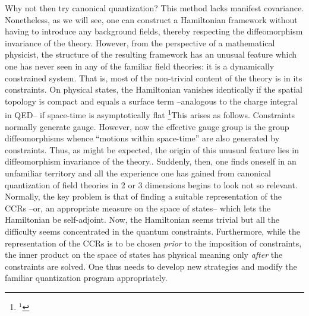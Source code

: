 Why not then try canonical quantization? This method lacks manifest
covariance. Nonetheless, as we will see, one can construct a Hamiltonian
framework without having to introduce any background fields, thereby
respecting the diffeomorphism invariance of the theory. However, from the
perspective of a mathematical physicist, the structure of the resulting
framework has an unusual feature which one has never seen in
any of the familiar field theories: it is a dynamically constrained system.
That is, most of the non-trivial content of the theory is in its constraints.
On physical states, the Hamiltonian vanishes identically if the spatial
topology is compact and equals a surface term --analogous to the charge
integral in QED-- if space-time is asymptotically flat
\footnote{$^1$}{This arises as follows. Constraints normally generate gauge.
However, now the effective gauge group is the group diffeomorphisms whence
``motions within space-time'' are also generated by constraints. Thus, as
might be expected, the origin of this unusual feature lies in diffeomorphism
invariance of the theory.}. Suddenly, then, one finds oneself
in an unfamiliar territory and all the experience one has gained from
canonical quantization of field theories in 2 or 3 dimensions begins to
look not so relevant. Normally, the key problem is that of finding a suitable
representation of the CCRs --or, an appropriate measure on the space of
states-- which lets the Hamiltonian be self-adjoint. Now, the Hamiltonian
seems trivial but all the difficulty seems concentrated in the quantum
constraints. Furthermore, while the representation of the CCRs is to be
chosen {\it prior} to the imposition of constraints, the inner product on
the space of states has physical meaning only {\it after} the constraints
are solved. One thus needs to develop new strategies and modify the familiar
quantization program appropriately.


